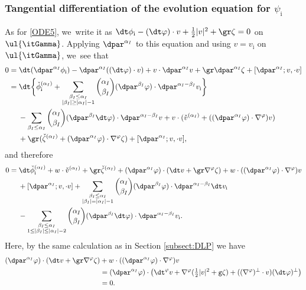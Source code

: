 \subsubsection{Tangential differentiation of the evolution equation for $\psi_\mathrm{i}$}
As for \eqref{ODE5}, we~write it as $\dt\phi_\mathrm{i}-(\dt\varphi)\cdot v+\frac12|v|^2+\gr\zeta=0$ on $\ul{\itGamma}$.
Applying $\dpar^{\alpha_I}$ to this equation and using $v=v_\mathrm{i}$ on $\ul{\itGamma}$, we~see that
\begin{align*}
0 &= \dt(\dpar^{\alpha_I}\phi_\mathrm{i}) - \dpar^{\alpha_I}((\dt\varphi)\cdot v) + v\cdot\dpar^{\alpha_I}v + \gr\dpar^{\alpha_I}\zeta + [\dpar^{\alpha_I};v,\cdot v] \\
&= \dt\biggl\{ \check{\phi}_\mathrm{i}^{(\alpha_I)}
+ \sum_{\substack{\beta_I\leq\alpha_I\\ |\beta_I|\geq|\alpha_I|-1}} \binom{\alpha_I}{\beta_I}(\dpar^{\beta_I}\varphi)\cdot\dpar^{\alpha_I-\beta_I}v_\mathrm{i} \biggr\} \\
&\quad\; - \sum_{\beta_I\leq\alpha_I} \binom{\alpha_I}{\beta_I}(\dpar^{\beta_I}\dt\varphi)\cdot\dpar^{\alpha_I-\beta_I}v
+ v\cdot(\check{v}^{(\alpha_I)}+((\dpar^{\alpha_I}\varphi)\cdot\nabla^\varphi)v) \\
&\quad\; + \gr(\check{\zeta}^{(\alpha_I)}+(\dpar^{\alpha_I}\varphi)\cdot\nabla^\varphi\zeta)+ [\dpar^{\alpha_I};v,\cdot v],
\end{align*}
and therefore
\begin{align*}
0&= \dt\check{\phi}_\mathrm{i}^{(\alpha_I)} + w\cdot\check{v}^{(\alpha_I)} + \gr\check{\zeta}^{(\alpha_I)}
+ (\dpar^{\alpha_I}\varphi)\cdot(\dt v +\gr\nabla^\varphi\zeta) + w\cdot((\dpar^{\alpha_I}\varphi)\cdot\nabla^\varphi)v \\
&\quad\; + [\dpar^{\alpha_I};v,\cdot v]
+ \sum_{\substack{\beta_I\leq\alpha_I\\ |\beta_I|=|\alpha_I|-1}} \binom{\alpha_I}{\beta_I}(\dpar^{\beta_I}\varphi)\cdot\dpar^{\alpha_I-\beta_I}\dt v_\mathrm{i} \\
&\quad\; - \sum_{\substack{\beta_I\leq\alpha_I\\ 1\leq|\beta_I|\leq|\alpha_I|-2}} \binom{\alpha_I}{\beta_I}(\dpar^{\beta_I}\dt\varphi)\cdot\dpar^{\alpha_I-\beta_I}v_\mathrm{i}.
\end{align*}
Here, by the same calculation as in Section \ref{subsect:DLP} we have
\begin{align*}
(\dpar^{\alpha_I}\varphi)\cdot(\dt v +\gr\nabla^\varphi\zeta) &+ w\cdot((\dpar^{\alpha_I}\varphi)\cdot\nabla^\varphi)v \\
&= (\dpar^{\alpha_I}\varphi)\cdot\bigl(\dt^\varphi v + \nabla^\varphi(\tfrac12|v|^2+\mbox{\tt g}\zeta) + ((\nabla^\varphi)^\perp\cdot v)(\dt\varphi)^\perp \bigr) \\
&= 0.
\end{align*}
